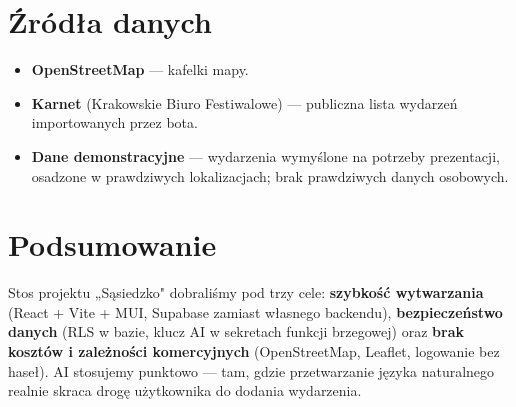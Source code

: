 \documentclass[11pt,a4paper]{article}
\begin{document}
\section{Źródła danych}

\begin{itemize}
  \item \textbf{OpenStreetMap} --- kafelki mapy.
  \item \textbf{Karnet} (Krakowskie Biuro Festiwalowe) --- publiczna lista wydarzeń importowanych przez bota.
  \item \textbf{Dane demonstracyjne} --- wydarzenia wymyślone na potrzeby prezentacji, osadzone
        w prawdziwych lokalizacjach; brak prawdziwych danych osobowych.
\end{itemize}

\section{Podsumowanie}

Stos projektu „Sąsiedzko" dobraliśmy pod trzy cele: \textbf{szybkość wytwarzania} (React + Vite + MUI,
Supabase zamiast własnego backendu), \textbf{bezpieczeństwo danych} (RLS w bazie, klucz AI w sekretach
funkcji brzegowej) oraz \textbf{brak kosztów i zależności komercyjnych} (OpenStreetMap, Leaflet,
logowanie bez haseł). AI stosujemy punktowo --- tam, gdzie przetwarzanie języka naturalnego realnie
skraca drogę użytkownika do dodania wydarzenia.
\end{document}
